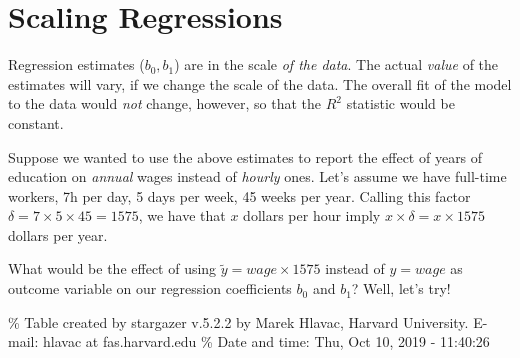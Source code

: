 \documentclass[]{book}
\newenvironment{tip}{\begin{tcolorbox}[colback=green!5!white,colframe=green]}{\end{tcolorbox}}
\begin{document}
\hypertarget{scaling-regressions}{%
\section{Scaling Regressions}\label{scaling-regressions}}

\begin{tip}
Regression estimates (\(b_0, b_1\)) are in the scale \emph{of the data}.
The actual \emph{value} of the estimates will vary, if we change the
scale of the data. The overall fit of the model to the data would
\emph{not} change, however, so that the \(R^2\) statistic would be
constant.
\end{tip}

Suppose we wanted to use the above estimates to report the effect of years of education on \emph{annual} wages instead of \emph{hourly} ones. Let's assume we have full-time workers, 7h per day, 5 days per week, 45 weeks per year. Calling this factor \(\delta = 7 \times 5 \times 45 = 1575\), we have that \(x\) dollars per hour imply \(x \times \delta = x \times 1575\) dollars per year.

What would be the effect of using \(\tilde{y} = wage \times 1575\) instead of \(y = wage\) as outcome variable on our regression coefficients \(b_0\) and \(b_1\)? Well, let's try!

\% Table created by stargazer v.5.2.2 by Marek Hlavac, Harvard University. E-mail: hlavac at fas.harvard.edu
\% Date and time: Thu, Oct 10, 2019 - 11:40:26
\end{document}
